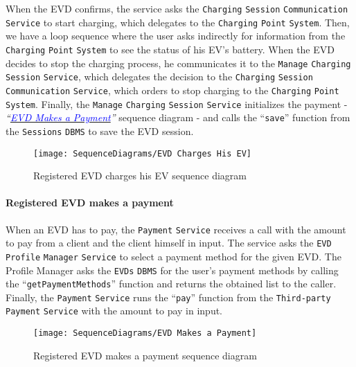 When the EVD confirms, the service asks the \verb|Charging| \verb|Session| \verb|Communication| \verb|Service| to start charging, which delegates to the \verb|Charging| \verb|Point| \verb|System|.
Then, we have a loop sequence where the user asks indirectly for information from the \verb|Charging| \verb|Point| \verb|System| to see the status of his EV's battery.
When the EVD decides to stop the charging process, he communicates it to the \verb|Manage| \verb|Charging| \verb|Session| \verb|Service|, which delegates the decision to the \verb|Charging| \verb|Session| \verb|Communication| \verb|Service|, which orders to stop charging to the \verb|Charging| \verb|Point| \verb|System|.
Finally, the \verb|Manage| \verb|Charging| \verb|Session| \verb|Service| initializes the payment - \textit{``}\hyperlink{evdmakespayment}{\textcolor{blue}{\textit{EVD Makes a Payment}}}\textit{''} sequence diagram - and calls the ``\verb|save|'' function from the \verb|Sessions| \verb|DBMS| to save the EVD session.
\begin{figure}[H]
    \begin{center}
        \texttt{[image: SequenceDiagrams/EVD Charges His EV]}
        \caption{Registered EVD charges his EV sequence diagram}
        \label{fig:evd_charges_his_ev}
    \end{center}
\end{figure}

\paragraph{\texorpdfstring{\protect\hypertarget{evdmakespayment}{Registered EVD makes a payment}}{}}
When an EVD has to pay, the \verb|Payment| \verb|Service| receives a call with the amount to pay from a client and the client himself in input.
The service asks the \verb|EVD| \verb|Profile| \verb|Manager| \verb|Service| to select a payment method for the given EVD\@.
The Profile Manager asks the \verb|EVDs| \verb|DBMS| for the user's payment methods by calling the ``\verb|getPaymentMethods|'' function and returns the obtained list to the caller.
Finally, the \verb|Payment| \verb|Service| runs the ``\verb|pay|'' function from the \verb|Third-party| \verb|Payment| \verb|Service| with the amount to pay in input.
\begin{figure}[H]
    \begin{center}
        \texttt{[image: SequenceDiagrams/EVD Makes a Payment]}
        \caption{Registered EVD makes a payment sequence diagram}
        \label{fig:evd_makes_payment}
    \end{center}
\end{figure}

